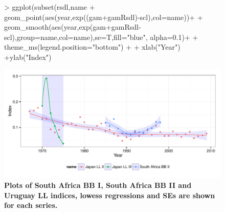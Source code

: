 \documentclass[shortnames,nojss,article]{jss}
\begin{document}
\begin{figure}\begin{center}
\begin{Schunk}
\begin{Sinput}
> ggplot(subset(rsdl,name %
+              geom_point(aes(year,exp((gam+gamRsdl)-scl),col=name))+
+              geom_smooth(aes(year,exp(gam+gamRsdl-scl),group=name,col=name),se=T,fill="blue", alpha=0.1)+
+              theme_ms(legend.position="bottom") +
+              xlab("Year") +ylab("Index")
\end{Sinput}
\end{Schunk}
\includegraphics{diags-016}
\caption{\bf{Plots of Japan LL II, Japan LL III and South Africa BB II indices, lowess regressions and SEs are shown for each series.}}\caption{\bf{Plots of South Africa BB I, South Africa BB II and Uruguay LL indices, lowess regressions and SEs are shown for each series.}}
\label{cpue:4}
\end{center}
\end{figure}
\end{document}
